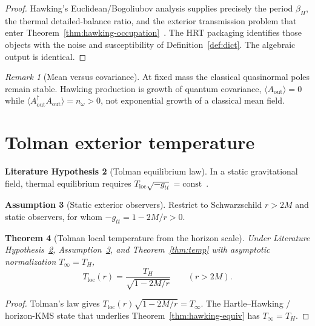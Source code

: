 \documentclass[11pt]{article}
\newtheorem{theorem}{Theorem}[section]
\theoremstyle{definition}
\newtheorem{assumption}[theorem]{Assumption}
\newtheorem{literaturehypothesis}[theorem]{Literature Hypothesis}
\theoremstyle{remark}
\newtheorem{remark}[theorem]{Remark}
\begin{document}
\begin{proof}
Hawking's Euclidean/Bogoliubov analysis supplies precisely the period $\beta_H$, the
thermal detailed-balance ratio, and the exterior transmission problem that enter
Theorem~\ref{thm:hawking-occupation}~\cite{Hawking1975,HuRavalSinha2002}.
The HRT packaging identifies those objects with the noise and susceptibility of
Definition~\ref{def:dict}.
The algebraic output is identical.
\end{proof}

\begin{remark}[Mean versus covariance]
\label{rem:mean}
At fixed mass the classical quasinormal poles remain stable.
Hawking production is growth of quantum covariance,
$\langle A_{\mathrm{out}}\rangle=0$ while
$\langle A_{\mathrm{out}}^{\dagger}A_{\mathrm{out}}\rangle=n_\omega>0$,
not exponential growth of a classical mean field.
\end{remark}

\section{Tolman exterior temperature}
\label{sec:tolman}
\begin{literaturehypothesis}[Tolman equilibrium law]
\label{lit:tolman}
In a static gravitational field, thermal equilibrium requires
$T_{\mathrm{loc}}\sqrt{-g_{tt}}=\mathrm{const}$~\cite{Tolman1930,TolmanEhrenfest1930}.
\end{literaturehypothesis}

\begin{assumption}[Static exterior observers]
\label{ass:static}
Restrict to Schwarzschild $r>2M$ and static observers, for whom
$-g_{tt}=1-2M/r>0$.
\end{assumption}

\begin{theorem}[Tolman local temperature from the horizon scale]
\label{thm:tolman}
Under Literature Hypothesis~\ref{lit:tolman}, Assumption~\ref{ass:static}, and
Theorem~\ref{thm:temp} with asymptotic normalization $T_\infty=T_H$,
\begin{equation}
\label{eq:tolman}
T_{\mathrm{loc}}(r)=\frac{T_H}{\sqrt{1-2M/r}}\qquad(r>2M).
\end{equation}
\end{theorem}

\begin{proof}
Tolman's law gives $T_{\mathrm{loc}}(r)\sqrt{1-2M/r}=T_\infty$.
The Hartle--Hawking / horizon-KMS state that underlies
Theorem~\ref{thm:hawking-equiv} has $T_\infty=T_H$.
\end{proof}
\end{document}
